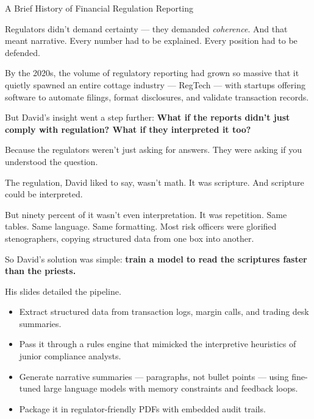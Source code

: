 \begin{HistoricalSidebar}{A Brief History of Financial Regulation Reporting}
    \medskip
    
    Regulators didn’t demand certainty — they demanded \textit{coherence}. And that meant narrative. Every 
    number had to be explained. Every position had to be defended.
    
    \medskip
    
    By the 2020s, the volume of regulatory reporting had grown so massive that it quietly spawned an entire 
    cottage industry — RegTech — with startups offering software to automate filings, format disclosures, and 
    validate transaction records.
    
    \medskip
    
    But David’s insight went a step further:
    \textbf{What if the reports didn’t just comply with regulation? What if they interpreted it too?}

    \medskip
    
    Because the regulators weren’t just asking for answers.
    They were asking if you understood the question.

\end{HistoricalSidebar}

\medskip

The regulation, David liked to say, wasn’t math. It was scripture.
And scripture could be interpreted.

But ninety percent of it wasn’t even interpretation. It was repetition.
Same tables. Same language. Same formatting.
Most risk officers were glorified stenographers, copying structured data from one box into another.

So David's solution was simple:
\textbf{train a model to read the scriptures faster than the priests.}

His slides detailed the pipeline.

\begin{itemize}
\item Extract structured data from transaction logs, margin calls, and trading desk summaries.
\item Pass it through a rules engine that mimicked the interpretive heuristics of junior compliance 
analysts.
\item Generate narrative summaries — paragraphs, not bullet points — using fine-tuned large language 
models with memory constraints and feedback loops.
\item Package it in regulator-friendly PDFs with embedded audit trails.
\end{itemize}


